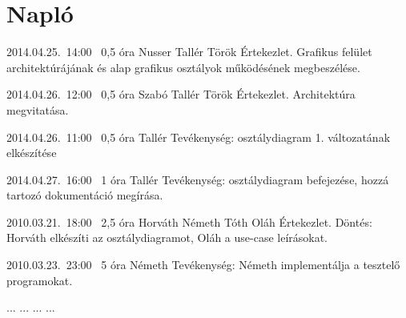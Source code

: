 %
\section{Napló}

\begin{naplo}

\bejegyzes
{2014.04.25.~14:00~}
{0,5 óra}
{Nusser\newline
Tallér\newline
Török}
{Értekezlet. Grafikus felület architektúrájának és alap grafikus osztályok működésének megbeszélése.}

\bejegyzes
{2014.04.26.~12:00~}
{0,5 óra}
{Szabó\newline
Tallér\newline
Török}
{Értekezlet. Architektúra megvitatása.}

\bejegyzes
{2014.04.26.~11:00~}
{0,5 óra}
{Tallér}
{Tevékenység: osztálydiagram 1. változatának elkészítése}

\bejegyzes
{2014.04.27.~16:00~}
{1 óra}
{Tallér}
{Tevékenység: osztálydiagram befejezése, hozzá tartozó dokumentáció megírása.}

\bejegyzes
{2010.03.21.~18:00~} %
{2,5 óra} %
{Horváth\newline
Németh\newline
Tóth\newline
Oláh} %
{Értekezlet. Döntés: Horváth elkészíti az osztálydiagramot, Oláh a use-case leírásokat.} %

\bejegyzes
{2010.03.23.~23:00~}
{5 óra}
{Németh}
{Tevékenység: Németh implementálja a tesztelő programokat.}

\bejegyzes
{...}
{...}
{...}
{...}


\end{naplo}

